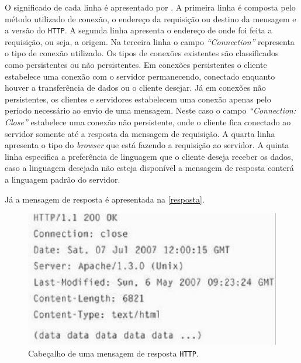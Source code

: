 O significado de cada linha é apresentado por \cite[p.~76]{kurose2010}. A primeira linha é composta 
pelo método utilizado de conexão, o endereço da requisição ou destino da mensagem e a 
versão do \texttt{HTTP}. A segunda linha apresenta o endereço de onde foi feita a requisição, 
ou seja, a origem. Na terceira linha o campo \textit{“Connection”}  representa o tipo de conexão 
utilizado. Os tipos de conexões existentes são classificados como persistentes ou não 
persistentes. Em conexões persistentes o cliente estabelece uma conexão com o servidor 
permanecendo, conectado enquanto houver a transferência de dados ou o cliente desejar. 
Já em conexões não persistentes, os clientes e servidores estabelecem uma conexão apenas 
pelo período necessário ao envio de uma mensagem. Neste caso o campo \textit{“Connection: Close”} 
estabelece uma conexão não persistente, onde o cliente fica conectado ao servidor somente 
até a resposta da mensagem de requisição. A quarta linha apresenta o tipo do \textit{browser} que 
está fazendo a requisição ao servidor. A quinta linha especifica a preferência de linguagem 
que o cliente deseja receber os dados, caso a linguagem desejada não esteja disponível a mensagem de resposta 
conterá a linguagem padrão do servidor.

Já a mensagem de resposta é apresentada na \autoref{resposta}.

\begin{figure}[h]
	\centering
	\caption{\label{resposta}Cabeçalho de uma mensagem de resposta \texttt{HTTP}.}
		\includegraphics[keepaspectratio=true,scale=0.6]{figuras/resposta.eps}
\end{figure}

